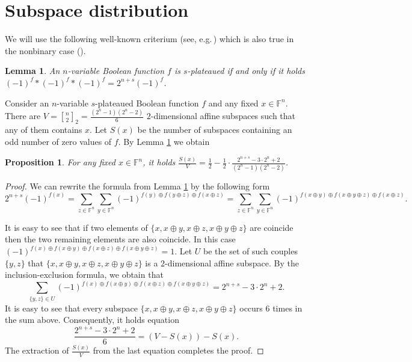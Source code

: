\documentclass[a4paper,12pt]{article}   %
\newtheorem{lemma}{Lemma}
\newtheorem{proposition}{Proposition}
\begin{document}
\section{Subspace distribution}

We will use the following well-known criterium (see,
e.g.\,\cite[Proposition 96]{Carlet}) which is also true in the
nonbinary case (\cite[Theorem 2]{MOA}).
\begin{lemma}\label{lem:conv}
An $n$-variable Boolean function $f$ is  $s$-plateaued  if and only
if it holds\\ ${(-1)^f}*{(-1)^f}*{(-1)^f}=2^{n+s}{(-1)^f}$.
\end{lemma}



Consider an $n$-variable $s$-plateaued Boolean function $f$ and any
fixed $x\in \mathbb{F}^n$. There are $V={n\brack
2}_2=\frac{(2^n-1)(2^n-2)}{6}$ $2$-dimensional affine subspaces such
that any of them contains $x$. Let $S(x)$ be the number of subspaces
containing an odd number of zero values of $f$. By Lemma
\ref{lem:conv} we obtain

\begin{proposition}\label{distrib0}
For any fixed $x\in \mathbb{F}^n$, it holds $\frac{S(x)}{V}=\frac12
-\frac12\cdot \frac{2^{n+s}-3\cdot2^n+2}{(2^n-1)(2^n-2)}$.
\end{proposition}
\begin{proof}
We can rewrite the formula from Lemma \ref{lem:conv} by the
following form
$$2^{n+s}(-1)^{f(x)}=\sum\limits_{z\in\mathbb{F}^n}\sum\limits_{y\in\mathbb{F}^n}(-1)^{f(y)\oplus f(y\oplus z)\oplus f(x\oplus z)}=\sum\limits_{z\in\mathbb{F}^n}\sum\limits_{y\in\mathbb{F}^n}(-1)^{f(x\oplus y)\oplus f(x\oplus y\oplus z)\oplus f(x\oplus z)}.$$

It is easy to see that if two elements of $\{x,x\oplus y, x\oplus z,
x\oplus y\oplus z\}$ are coincide then the two remaining elements
are also coincide. In this case $(-1)^{f(x)\oplus f(x\oplus y)\oplus
f(x\oplus z)\oplus f(x\oplus y\oplus z)}=1$. Let $U$ be the set of
such couples $\{y,z\}$ that $\{x,x\oplus y, x\oplus z, x\oplus
y\oplus z\}$ is a $2$-dimensional affine subspace.
 By the
inclusion-exclusion formula, we obtain that
$$\sum\limits_{\{y,z\} \in U}(-1)^{f(x)\oplus f(x\oplus
y)\oplus f(x\oplus z)\oplus f(x\oplus y\oplus z)}=2^{n+s}-3\cdot
2^n+2.$$ It is easy to see that every subspace $\{x,x\oplus y,
x\oplus z, x\oplus y\oplus z\}$ occurs $6$ times in the sum above.
Consequently, it holds equation $$\frac{2^{n+s}-3\cdot
2^n+2}{6}=(V-S(x))-S(x).$$ The extraction of $\frac{S(x)}{V}$ from
the last equation  completes the proof.
\end{proof}
\end{document}
